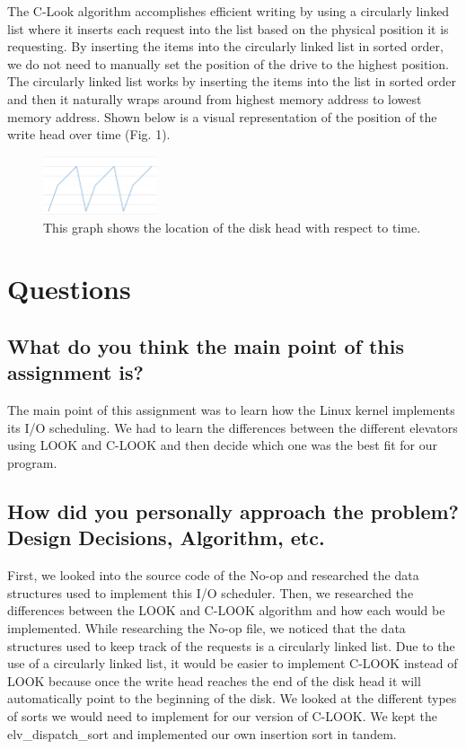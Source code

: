 \documentclass[draftclsnofoot, onecolumn, compsoc, 10pt]{IEEEtran}
\begin{document}
    The C-Look algorithm accomplishes efficient writing by using a circularly linked list where it inserts each request into the list based on the physical position it is requesting. By inserting the items into the circularly linked list in sorted order, we do not need to manually set the position of the drive to the highest position. The circularly linked list works by inserting the items into the list in sorted order and then it naturally wraps around from highest memory address to lowest memory address. Shown below is a visual representation of the position of the write head over time (Fig. 1). \\
\begin{figure}[ht]
\centering
\includegraphics[width=0.3\textwidth]{img.eps}
\caption{\label{fig:graph}This graph shows the location of the disk head with respect to time.}
\end{figure}

\section{Questions}
    \subsection{What do you think the main point of this assignment is?}
    The main point of this assignment was to learn how the Linux kernel implements its I/O scheduling. We had to learn the differences between the different elevators using LOOK and C-LOOK and then decide which one was the best fit for our program.
    \subsection{How did you personally approach the problem? Design Decisions, Algorithm, etc.}
    First, we looked into the source code of the No-op and researched the data structures used to implement this I/O scheduler. Then, we researched the differences between the LOOK and C-LOOK algorithm and how each would be implemented. While researching the No-op file, we noticed that the data structures used to keep track of the requests is a circularly linked list. Due to the use of a circularly linked list, it would be easier to implement C-LOOK instead of LOOK because once the write head reaches the end of the disk head it will automatically point to the beginning of the disk. We looked at the different types of sorts we would need to implement for our version of C-LOOK. We kept the elv\_dispatch\_sort and implemented our own insertion sort in tandem.
\end{document}
